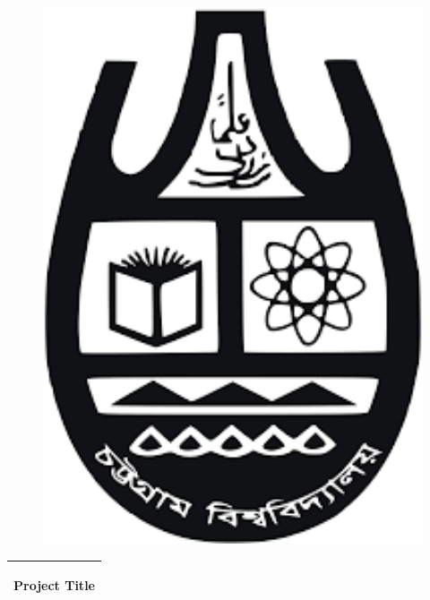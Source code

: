 \begin{titlepage}

\begin{figure}
	\centering
	\begin{minipage}[b]{0.15\textwidth}
		\includegraphics[width=1\textwidth]{images/cu}
	\end{minipage} \hfill
	\end{figure}
	
\noindent%
  \begin{tabular}{@{}p{\textwidth}@{}}
    \hline
    \hline
    \vspace{0.2cm}
    \begin{center}
    \Huge{\textbf{
      Project Title %
    }}
    \end{center}
    \vspace{0.2cm}\\
    \hline
    \hline
  \end{tabular}
  \vspace{4 cm}


\end{titlepage}
